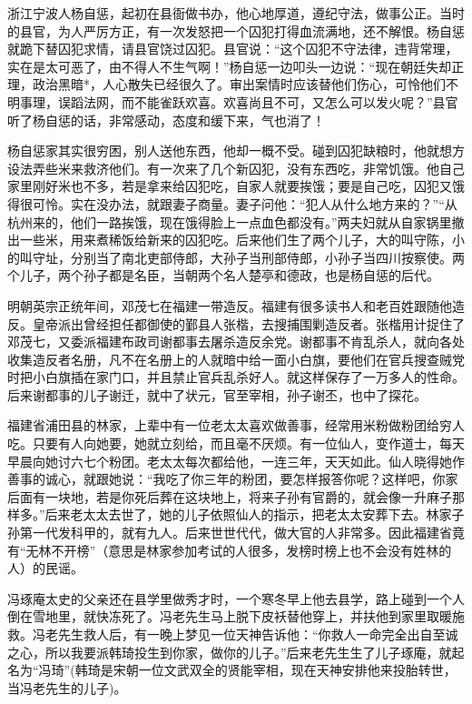 \documentclass[12pt,UTF8]{ctexbook}
\begin{document}
浙江宁波人杨自惩，起初在县衙做书办，他心地厚道，遵纪守法，做事公正。当时的县官，为人严厉方正，有一次发怒把一个囚犯打得血流满地，还不解恨。杨自惩就跪下替囚犯求情，请县官饶过囚犯。县官说：“这个囚犯不守法律，违背常理，实在是太可恶了，由不得人不生气啊！”杨自惩一边叩头一边说：“现在朝廷失却正理，政治黑暗*，人心散失已经很久了。审出案情时应该替他们伤心，可怜他们不明事理，误蹈法网，而不能雀跃欢喜。欢喜尚且不可，又怎么可以发火呢？”县官听了杨自惩的话，非常感动，态度和缓下来，气也消了！

杨自惩家其实很穷困，别人送他东西，他却一概不受。碰到囚犯缺粮时，他就想方设法弄些米来救济他们。有一次来了几个新囚犯，没有东西吃，非常饥饿。他自己家里刚好米也不多，若是拿来给囚犯吃，自家人就要挨饿；要是自己吃，囚犯又饿得很可怜。实在没办法，就跟妻子商量。妻子问他：“犯人从什么地方来的？”“从杭州来的，他们一路挨饿，现在饿得脸上一点血色都没有。”两夫妇就从自家锅里撤出一些米，用来煮稀饭给新来的囚犯吃。后来他们生了两个儿子，大的叫守陈，小的叫守址，分别当了南北吏部侍郎，大孙子当刑部侍郎，小孙子当四川按察使。两个儿子，两个孙子都是名臣，当朝两个名人楚亭和德政，也是杨自惩的后代。

明朝英宗正统年间，邓茂七在福建一带造反。福建有很多读书人和老百姓跟随他造反。皇帝派出曾经担任都御使的鄞县人张楷，去搜捕围剿造反者。张楷用计捉住了邓茂七，又委派福建布政司谢都事去屠杀造反余党。谢都事不肯乱杀人，就向各处收集造反者名册，凡不在名册上的人就暗中给一面小白旗，要他们在官兵搜查贼党时把小白旗插在家门口，并且禁止官兵乱杀好人。就这样保存了一万多人的性命。后来谢都事的儿子谢迁，就中了状元，官至宰相，孙子谢丕，也中了探花。

福建省浦田县的林家，上辈中有一位老太太喜欢做善事，经常用米粉做粉团给穷人吃。只要有人向她要，她就立刻给，而且毫不厌烦。有一位仙人，变作道士，每天早晨向她讨六七个粉团。老太太每次都给他，一连三年，天天如此。仙人晓得她作善事的诚心，就跟她说：“我吃了你三年的粉团，要怎样报答你呢？这样吧，你家后面有一块地，若是你死后葬在这块地上，将来子孙有官爵的，就会像一升麻子那样多。”后来老太太去世了，她的儿子依照仙人的指示，把老太太安葬下去。林家子孙第一代发科甲的，就有九人。后来世世代代，做大官的人非常多。因此福建省竟有“无林不开榜”（意思是林家参加考试的人很多，发榜时榜上也不会没有姓林的人）的民谣。

冯琢庵太史的父亲还在县学里做秀才时，一个寒冬早上他去县学，路上碰到一个人倒在雪地里，就快冻死了。冯老先生马上脱下皮袄替他穿上，并扶他到家里取暖施救。冯老先生救人后，有一晚上梦见一位天神告诉他：“你救人一命完全出自至诚之心，所以我要派韩琦投生到你家，做你的儿子。”后来老先生生了儿子琢庵，就起名为“冯琦”(韩琦是宋朝一位文武双全的贤能宰相，现在天神安排他来投胎转世，当冯老先生的儿子)。
\end{document}
